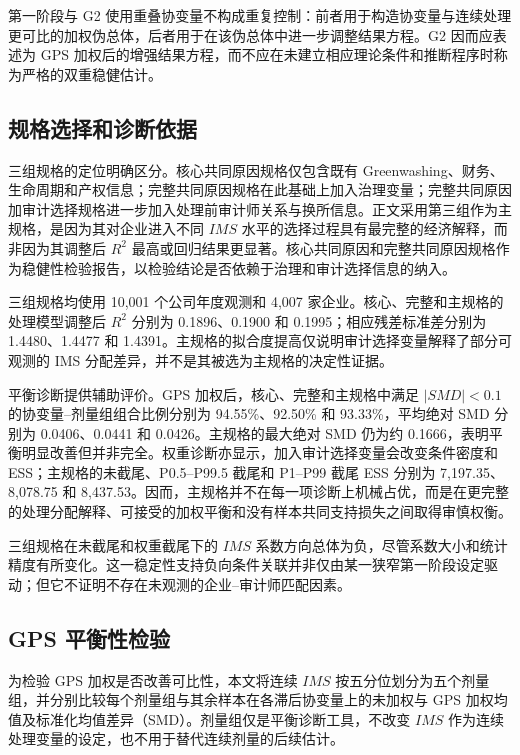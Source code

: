 \documentclass[11pt]{article}
\begin{document}
第一阶段与 G2 使用重叠协变量不构成重复控制：前者用于构造协变量与连续处理更可比的加权伪总体，后者用于在该伪总体中进一步调整结果方程。G2 因而应表述为 GPS 加权后的增强结果方程，而不应在未建立相应理论条件和推断程序时称为严格的双重稳健估计。

\subsection{规格选择和诊断依据}

三组规格的定位明确区分。核心共同原因规格仅包含既有 Greenwashing、财务、生命周期和产权信息；完整共同原因规格在此基础上加入治理变量；完整共同原因加审计选择规格进一步加入处理前审计师关系与换所信息。正文采用第三组作为主规格，是因为其对企业进入不同 $IMS$ 水平的选择过程具有最完整的经济解释，而非因为其调整后 $R^2$ 最高或回归结果更显著。核心共同原因和完整共同原因规格作为稳健性检验报告，以检验结论是否依赖于治理和审计选择信息的纳入。

三组规格均使用 10,001 个公司年度观测和 4,007 家企业。核心、完整和主规格的处理模型调整后 $R^2$ 分别为 0.1896、0.1900 和 0.1995；相应残差标准差分别为 1.4480、1.4477 和 1.4391。主规格的拟合度提高仅说明审计选择变量解释了部分可观测的 IMS 分配差异，并不是其被选为主规格的决定性证据。

平衡诊断提供辅助评价。GPS 加权后，核心、完整和主规格中满足 $|SMD|<0.1$ 的协变量--剂量组组合比例分别为 94.55\%、92.50\% 和 93.33\%，平均绝对 SMD 分别为 0.0406、0.0441 和 0.0426。主规格的最大绝对 SMD 仍为约 0.1666，表明平衡明显改善但并非完全。权重诊断亦显示，加入审计选择变量会改变条件密度和 ESS；主规格的未截尾、P0.5--P99.5 截尾和 P1--P99 截尾 ESS 分别为 7,197.35、8,078.75 和 8,437.53。因而，主规格并不在每一项诊断上机械占优，而是在更完整的处理分配解释、可接受的加权平衡和没有样本共同支持损失之间取得审慎权衡。

三组规格在未截尾和权重截尾下的 $IMS$ 系数方向总体为负，尽管系数大小和统计精度有所变化。这一稳定性支持负向条件关联并非仅由某一狭窄第一阶段设定驱动；但它不证明不存在未观测的企业--审计师匹配因素。

\subsection{GPS 平衡性检验}

为检验 GPS 加权是否改善可比性，本文将连续 $IMS$ 按五分位划分为五个剂量组，并分别比较每个剂量组与其余样本在各滞后协变量上的未加权与 GPS 加权均值及标准化均值差异（SMD）。剂量组仅是平衡诊断工具，不改变 $IMS$ 作为连续处理变量的设定，也不用于替代连续剂量的后续估计。
\end{document}
